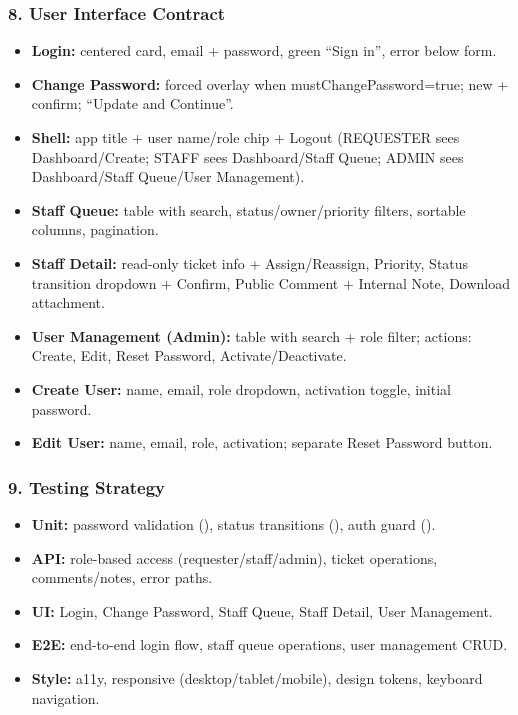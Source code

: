 \documentclass[11pt,a4paper]{article}
\begin{document}
\subsubsection*{8. User Interface Contract}
\begin{itemize}
\item \textbf{Login:} centered card, email + password, green ``Sign in'', error below form.
\item \textbf{Change Password:} forced overlay when mustChangePassword=true; new + confirm; ``Update and Continue''.
\item \textbf{Shell:} app title + user name/role chip + Logout (REQUESTER sees Dashboard/Create; STAFF sees Dashboard/Staff Queue; ADMIN sees Dashboard/Staff Queue/User Management).
\item \textbf{Staff Queue:} table with search, status/owner/priority filters, sortable columns, pagination.
\item \textbf{Staff Detail:} read-only ticket info + Assign/Reassign, Priority, Status transition dropdown + Confirm, Public Comment + Internal Note, Download attachment.
\item \textbf{User Management (Admin):} table with search + role filter; actions: Create, Edit, Reset Password, Activate/Deactivate.
\item \textbf{Create User:} name, email, role dropdown, activation toggle, initial password.
\item \textbf{Edit User:} name, email, role, activation; separate Reset Password button.
\end{itemize}

\subsubsection*{9. Testing Strategy}
\begin{itemize}
\item \textbf{Unit:} password validation (), status transitions (), auth guard ().
\item \textbf{API:} role-based access (requester/staff/admin), ticket operations, comments/notes, error paths.
\item \textbf{UI:} Login, Change Password, Staff Queue, Staff Detail, User Management.
\item \textbf{E2E:} end-to-end login flow, staff queue operations, user management CRUD.
\item \textbf{Style:} a11y, responsive (desktop/tablet/mobile), design tokens, keyboard navigation.
\end{itemize}
\end{document}
